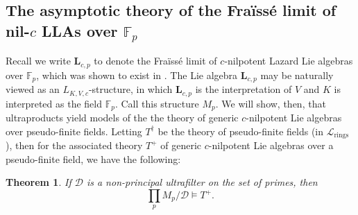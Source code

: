 \documentclass[psamsfonts]{amsart}
\newtheorem{thm}{Theorem}[section]
\theoremstyle{definition}
\theoremstyle{definition}
\theoremstyle{remark}
\numberwithin{equation}{section}
\newcommand\LL{\mathscr{L}}
\renewcommand{\models}{\vDash}
\begin{document}
\subsection{The asymptotic theory of the Fra\"iss\'e limit of nil-$c$ LLAs over $\mathbb{F}_{p}$}

Recall we write $\mathbf{L}_{c,p}$ to denote the Fra\"iss\'e limit of $c$-nilpotent Lazard Lie algebras over $\mathbb{F}_{p}$, which was shown to exist in \cite[Theorem 4.37]{d2023model}.  The Lie algebra $\mathbf{L}_{c,p}$ may be naturally viewed as an $L_{K,V,c}$-structure, in which $\mathbf{L}_{c,p}$ is the interpretation of $V$ and $K$ is interpreted as the field $\mathbb{F}_{p}$. Call this structure $M_{p}$. We will show, then, that ultraproducts yield models of the the theory of generic $c$-nilpotent Lie algebras over pseudo-finite fields.  Letting $T^{\dagger}$ be the theory of pseudo-finite fields (in $\LL_{\mathrm{rings}}$), then for the associated theory $T^{+}$ of generic $c$-nilpotent Lie algebras over a pseudo-finite field, we have the following:

\begin{thm}
    If $\mathcal{D}$ is a non-principal ultrafilter on the set of primes, then 
    $$
    \prod_{p} M_{p}/\mathcal{D} \models T^{+}. 
    $$
\end{thm}
\end{document}
